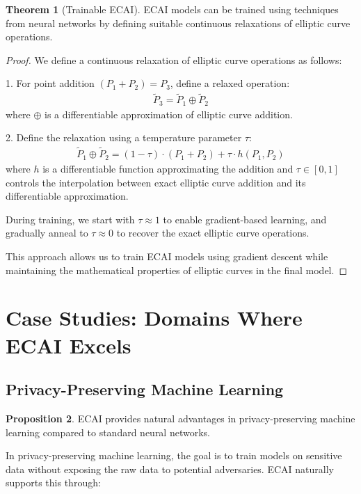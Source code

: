 \documentclass[12pt,a4paper]{article}
\theoremstyle{definition}
\newtheorem{theorem}{Theorem}
\newtheorem{proposition}[theorem]{Proposition}
\begin{document}
\begin{theorem}[Trainable ECAI]
ECAI models can be trained using techniques from neural networks by defining suitable continuous relaxations of elliptic curve operations.
\end{theorem}

\begin{proof}
We define a continuous relaxation of elliptic curve operations as follows:

1. For point addition $(P_1 + P_2) = P_3$, define a relaxed operation:
\begin{align}
\tilde{P}_3 = \tilde{P}_1 \oplus \tilde{P}_2
\end{align}
where $\oplus$ is a differentiable approximation of elliptic curve addition.

2. Define the relaxation using a temperature parameter $\tau$:
\begin{align}
\tilde{P}_1 \oplus \tilde{P}_2 = (1 - \tau) \cdot (P_1 + P_2) + \tau \cdot h(P_1, P_2)
\end{align}
where $h$ is a differentiable function approximating the addition and $\tau \in [0, 1]$ controls the interpolation between exact elliptic curve addition and its differentiable approximation.

During training, we start with $\tau \approx 1$ to enable gradient-based learning, and gradually anneal to $\tau \approx 0$ to recover the exact elliptic curve operations.

This approach allows us to train ECAI models using gradient descent while maintaining the mathematical properties of elliptic curves in the final model.
\end{proof}

\section{Case Studies: Domains Where ECAI Excels}

\subsection{Privacy-Preserving Machine Learning}

\begin{proposition}
ECAI provides natural advantages in privacy-preserving machine learning compared to standard neural networks.
\end{proposition}

In privacy-preserving machine learning, the goal is to train models on sensitive data without exposing the raw data to potential adversaries. ECAI naturally supports this through:
\end{document}
